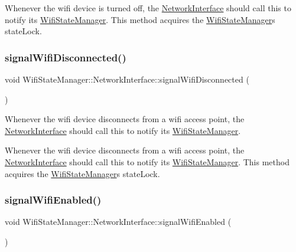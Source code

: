 Whenever the wifi device is turned off, the \mbox{\hyperlink{classWifiStateManager_1_1NetworkInterface}{Network\+Interface}} should call this to notify its \mbox{\hyperlink{classWifiStateManager}{Wifi\+State\+Manager}}. This method acquires the \mbox{\hyperlink{classWifiStateManager}{Wifi\+State\+Manager}}\textquotesingle{}s state\+Lock. \mbox{\label{classWifiStateManager_1_1NetworkInterface_a240d4a02fabfd92c6384fc404d979aac}} 
\subsubsection{\texorpdfstring{signal\+Wifi\+Disconnected()}{signalWifiDisconnected()}}
{\footnotesize\ttfamily void Wifi\+State\+Manager\+::\+Network\+Interface\+::signal\+Wifi\+Disconnected (\begin{DoxyParamCaption}{ }\end{DoxyParamCaption})\hspace{0.3cm}{\ttfamily [protected]}}

Whenever the wifi device disconnects from a wifi access point, the \mbox{\hyperlink{classWifiStateManager_1_1NetworkInterface}{Network\+Interface}} should call this to notify its \mbox{\hyperlink{classWifiStateManager}{Wifi\+State\+Manager}}.

Whenever the wifi device disconnects from a wifi access point, the \mbox{\hyperlink{classWifiStateManager_1_1NetworkInterface}{Network\+Interface}} should call this to notify its \mbox{\hyperlink{classWifiStateManager}{Wifi\+State\+Manager}}. This method acquires the \mbox{\hyperlink{classWifiStateManager}{Wifi\+State\+Manager}}\textquotesingle{}s state\+Lock. \mbox{\label{classWifiStateManager_1_1NetworkInterface_aa97315b54f7a73f1643823856fbf50c7}} 
\subsubsection{\texorpdfstring{signal\+Wifi\+Enabled()}{signalWifiEnabled()}}
{\footnotesize\ttfamily void Wifi\+State\+Manager\+::\+Network\+Interface\+::signal\+Wifi\+Enabled (\begin{DoxyParamCaption}{ }\end{DoxyParamCaption})\hspace{0.3cm}{\ttfamily [protected]}}

